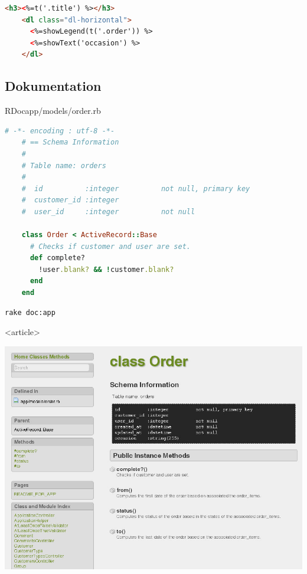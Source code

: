 \begin{Frame}[fragile,t]
  
  \begin{lstlisting}[language=HTML,gobble=4]
    <h3><%=t('.title') %></h3>
    <dl class="dl-horizontal">
      <%=showLegend(t('.order')) %>
      <%=showText('occasion') %>
    </dl>
  \end{lstlisting}
\end{Frame}

\subsection{Dokumentation}

\begin{Frame}[fragile]{RDoc}{app/models/order.rb}
  \begin{lstlisting}[language=Ruby,gobble=4]
    # -*- encoding : utf-8 -*-
    # == Schema Information
    #
    # Table name: orders
    #
    #  id          :integer          not null, primary key
    #  customer_id :integer
    #  user_id     :integer          not null

    class Order < ActiveRecord::Base    
      # Checks if customer and user are set.
      def complete?
        !user.blank? && !customer.blank?
      end
    end
  \end{lstlisting}
  
  
  \begin{lstlisting}[language={},gobble=4]
    rake doc:app
  \end{lstlisting}
\end{Frame}

\mode
<article>

\begin{center}
  \includegraphics[width=.4\paperwidth]{images/rdoc}
\end{center}

